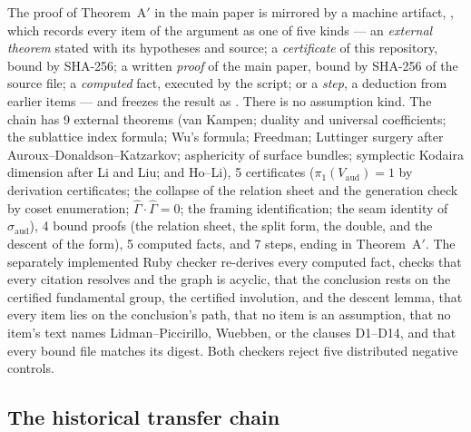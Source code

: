 \documentclass[11pt]{article}
\newcommand{\pione}{\pi_1}
\newcommand{\Ghat}{\widehat{\Gamma}}
\theoremstyle{definition}
\begin{document}
The proof of Theorem~A$'$ in the main paper is mirrored by a machine
artifact, , which
records every item of the argument as one of five kinds --- an
\emph{external theorem} stated with its hypotheses and source; a
\emph{certificate} of this repository, bound by SHA-256; a written
\emph{proof} of the main paper, bound by SHA-256 of the source file; a
\emph{computed} fact, executed by the script; or a \emph{step}, a deduction
from earlier items --- and freezes the result as
.  There is no assumption kind.
The chain has 9 external theorems (van Kampen; duality and universal
coefficients; the sublattice index formula; Wu's formula; Freedman;
Luttinger surgery after Auroux--Donaldson--Katzarkov; asphericity of surface
bundles; symplectic Kodaira dimension after Li and Liu; and Ho--Li), 5
certificates ($\pione(V_{\mathrm{aud}})=1$ by derivation certificates; the
collapse of the relation sheet and the generation check by coset
enumeration; $\Ghat\cdot\Ghat=0$; the framing identification; the seam
identity of $\sigma_{\mathrm{aud}}$), 4 bound proofs (the relation sheet,
the split form, the double, and the descent of the form), 5 computed facts,
and 7 steps, ending in Theorem~A$'$.  The separately
implemented Ruby checker  re-derives
every computed fact, checks that every citation resolves and the graph is
acyclic, that the conclusion rests on the certified fundamental group, the
certified involution, and the descent lemma, that every item lies on the
conclusion's path, that no item is an assumption, that no item's text names
Lidman--Piccirillo, Wuebben, or the clauses D1--D14, and that every bound
file matches its digest.  Both checkers reject five distributed negative
controls.

\subsection*{The historical transfer chain}
\end{document}
